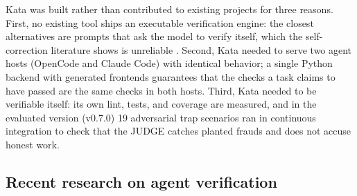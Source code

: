 \documentclass[11pt]{article}
\begin{document}
Kata was built rather than contributed to existing projects for three
reasons. First, no existing tool ships an executable verification engine:
the closest alternatives are prompts that ask the model to verify itself,
which the self-correction literature shows is unreliable \cite{selfcorrect}.
Second,
Kata needed to serve two agent hosts (OpenCode and Claude Code) with
identical behavior; a single Python backend with generated frontends
guarantees that the checks a task claims to have passed are the same checks
in both hosts. Third, Kata needed to be verifiable itself: its own lint,
tests, and coverage are measured, and in the evaluated version (v0.7.0) 19
adversarial trap scenarios ran in continuous integration to check that the
JUDGE catches planted frauds and does not accuse honest work.

\subsection{Recent research on agent verification}
\end{document}
